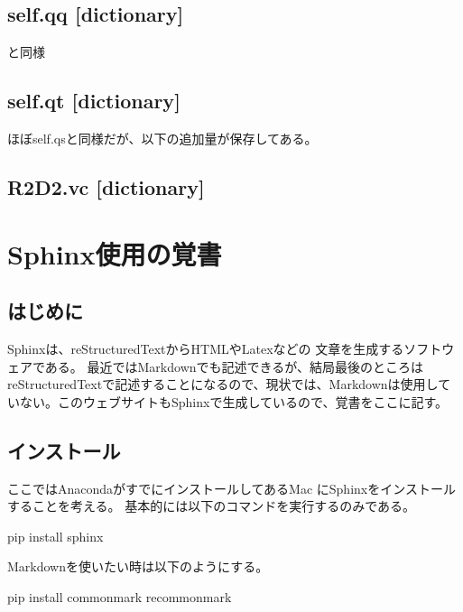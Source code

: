 \documentclass[letterpaper,10pt,dvipdfmx,report]{sphinxmanual}
\begin{document}
\section{self.qq {[}dictionary{]}}
\label{\detokenize{notation:self-qq-dictionary}}
 と同様


\section{self.qt {[}dictionary{]}}
\label{\detokenize{notation:self-qt-dictionary}}
ほぼself.qsと同様だが、以下の追加量が保存してある。


\section{R2D2.vc {[}dictionary{]}}
\label{\detokenize{notation:r2d2-vc-dictionary}}

\chapter{Sphinx使用の覚書}
\label{\detokenize{sphinx:sphinx}}\label{\detokenize{sphinx::doc}}

\section{はじめに}
\label{\detokenize{sphinx:id1}}
Sphinxは、reStructuredTextからHTMLやLatexなどの
文章を生成するソフトウェアである。
最近ではMarkdownでも記述できるが、結局最後のところはreStructuredTextで記述することになるので、現状では、Markdownは使用していない。このウェブサイトもSphinxで生成しているので、覚書をここに記す。


\section{インストール}
\label{\detokenize{sphinx:id3}}
ここではAnacondaがすでにインストールしてあるMac
にSphinxをインストールすることを考える。
基本的には以下のコマンドを実行するのみである。

\begin{sphinxVerbatim}[commandchars=\\\{\}]
pip install sphinx
\end{sphinxVerbatim}

Markdownを使いたい時は以下のようにする。

\begin{sphinxVerbatim}[commandchars=\\\{\}]
pip install commonmark recommonmark
\end{sphinxVerbatim}
\end{document}
